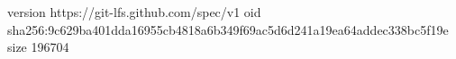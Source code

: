 version https://git-lfs.github.com/spec/v1
oid sha256:9c629ba401dda16955cb4818a6b349f69ac5d6d241a19ea64addec338bc5f19e
size 196704
